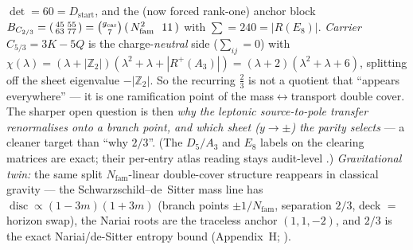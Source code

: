 \documentclass[11pt,a4paper]{article}
\newcommand{\gcar}{g_{\mathrm{car}}}
\newcommand{\Nfam}{N_{\mathrm{fam}}}
\newcommand{\Z}{\mathbb{Z}}
\theoremstyle{definition}
\begin{document}
\begin{keybox}
$\det=60=D_{\mathrm{start}}$, and the (now forced rank-one) anchor block
$B_{C_{2/3}}=\begin{psmallmatrix}45&55\\63&77\end{psmallmatrix}=\binom{\gcar}{7}\,(\,\Nfam^2\ \ 11\,)$ with
$\sum=240=|R(E_8)|$. \emph{Carrier} $C_{5/3}=3K-5Q$ is the charge-\emph{neutral} side ($\sum_{ij}=0$) with
$\chi(\lambda)=(\lambda+|\Z_2|)(\lambda^2+\lambda+|R^+(A_3)|)=(\lambda+2)(\lambda^2+\lambda+6)$, splitting off
the sheet eigenvalue $-|\Z_2|$. So the recurring $\tfrac23$ is not a quotient that ``appears everywhere'' --- it
is one ramification point of the mass$\leftrightarrow$transport double cover. The sharper open question is then
\emph{why the leptonic source-to-pole transfer renormalises onto a branch point, and which sheet ($y\to\pm$) the
parity selects} --- a cleaner target than ``why $2/3$''. (The $D_5/A_3$ and $E_8$ labels on the clearing matrices
are exact; their per-entry atlas reading stays audit-level \mC.) \emph{Gravitational twin:} the same split
$\Nfam$-linear double-cover structure reappears in classical gravity --- the Schwarzschild--de~Sitter mass
line has $\operatorname{disc}\propto(1-3m)(1+3m)$ (branch points $\pm1/\Nfam$, separation $2/3$, deck $=$
horizon swap), the Nariai roots are the traceless anchor $(1,1,-2)$, and $2/3$ is the exact Nariai/de-Sitter
entropy bound (Appendix~H; ).
\end{keybox}
\end{document}
